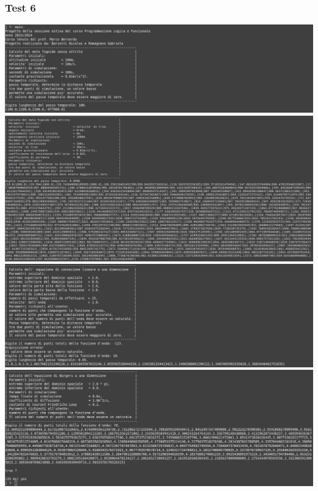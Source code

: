 \subsubsection*{Test 6}
\includegraphics[width=\textwidth,height=\textheight,keepaspectratio]{05_testing/image/pro/06_test/01.png}
\\
\includegraphics[width=\textwidth,height=\textheight,keepaspectratio]{05_testing/image/pro/06_test/02.png}
\\
\includegraphics[width=\textwidth,height=\textheight,keepaspectratio]{05_testing/image/pro/06_test/03.png}
\\
\includegraphics[width=\textwidth,height=\textheight,keepaspectratio]{05_testing/image/pro/06_test/04.png}

